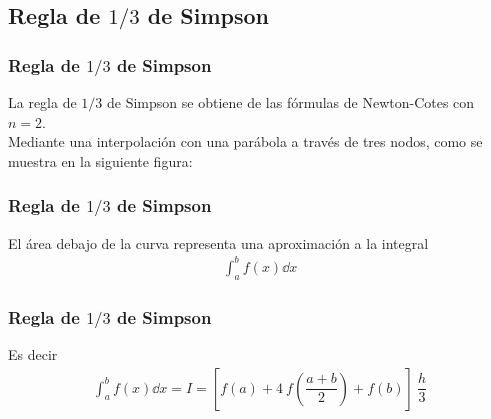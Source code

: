 \subsection{Regla de \texorpdfstring{$1/3$}{1/3} de Simpson}
\begin{frame}
\frametitle{Regla de $1/3$ de Simpson}
La regla de $1/3$ de Simpson se obtiene de las fórmulas de Newton-Cotes con $n = 2$.
\\
\bigskip
Mediante una interpolación con una parábola a través de tres nodos, como se muestra en la siguiente figura:
\end{frame}
\begin{frame}
\frametitle{Regla de $1/3$ de Simpson}
\begin{figure}
	\centering
	
\end{figure}
El área debajo de la curva representa una aproximación a la integral
\begin{align*}
\int_{a}^{b} f(x) \dd{x}
\end{align*}
\end{frame}
\begin{frame}
\frametitle{Regla de $1/3$ de Simpson}
Es decir
\begin{align*}
\int_{a}^{b} f(x) \dd{x} = I = \left[ f(a) + 4 \: f \left( \dfrac{a + b}{2} \right) + f(b) \right] \: \dfrac{h}{3}
\end{align*}
\end{frame}
